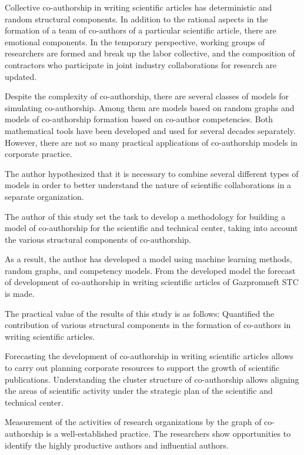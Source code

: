 \documentclass[12pt]{report}
\theoremstyle{definition}
\begin{document}
Collective co-authorship in writing scientific articles has deterministic and random structural components. 
In addition to the rational aspects in the formation of a team of co-authors of a particular scientific article, there are emotional components. 
In the temporary perspective, working groups of researchers are formed and break up the labor collective, and the composition of contractors who participate in joint industry collaborations for research are updated.

Despite the complexity of co-authorship, there are several classes of models for simulating co-authorship. 
Among them are models based on random graphs and models of co-authorship formation based on co-author competencies. 
Both mathematical tools have been developed and used for several decades separately. 
However, there are not so many practical applications of co-authorship models in corporate practice.

The author hypothesized that it is necessary to combine several different types of models in order to better understand the nature of scientific collaborations in a separate organization. 

The author of this study set the task to develop a methodology for building a model of co-authorship for the scientific and technical center, taking into account the various structural components of co-authorship. 

As a result, the author has developed a model using machine learning methods, random graphs, and competency models. 
From the developed model the forecast of development of co-authorship in writing scientific articles of Gazpromneft STC is made.

The practical value of the results of this study is as follows: Quantified the contribution of various structural components in the formation of co-authors in writing scientific articles.

Forecasting the development of co-authorship in writing scientific articles allows to carry out 
planning corporate resources to support the growth of scientific publications.
Understanding the cluster structure of co-authorship allows aligning the areas of scientific activity under the strategic plan of the scientific and technical center.


Measurement of the activities of research organizations by the graph of co-authorship is a well-established practice. 
The researchers show opportunities to identify the highly productive authors and influential authors. 
\end{document}
